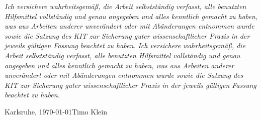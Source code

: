 \mbox{}\thispagestyle{empty}

\vspace*{1cm}

{\Large \textbf{}} 

\bigskip

{
\textit{Ich versichere wahrheitsgemäß, die Arbeit selbstständig verfasst, alle benutzten Hilfsmittel vollständig und genau angegeben und alles kenntlich gemacht zu haben, was aus Arbeiten anderer unverändert oder mit Abänderungen entnommen wurde sowie die Satzung des KIT zur Sicherung guter wissenschaftlicher Praxis in der jeweils gültigen Fassung beachtet zu haben.}}
{
\textit{Ich versichere wahrheitsgemäß, die Arbeit selbstständig verfasst, alle benutzten Hilfsmittel vollständig und genau angegeben und alles kenntlich gemacht zu haben, was aus Arbeiten anderer unverändert oder mit Abänderungen entnommen wurde sowie die Satzung des KIT zur Sicherung guter wissenschaftlicher Praxis in der jeweils gültigen Fassung beachtet zu haben.}}

\vspace{1cm}

%
%
%
%
Karlsruhe, \today \hfill Timo Klein


